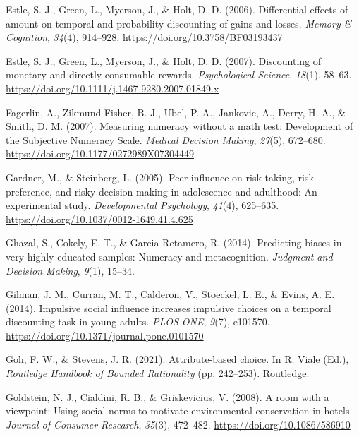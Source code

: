 \documentclass[
  pub,floatsintext]{apa6}
\newlength{\cslhangindent}
\newlength{\cslentryspacingunit} %
\newenvironment{CSLReferences}[2] %
 {%
  \setlength{\parindent}{0pt}
  \ifodd #1
  \let\oldpar\par
  \def\par{\hangindent=\cslhangindent\oldpar}
  \fi
  \setlength{\parskip}{#2\cslentryspacingunit}
 }%
 {}
\begin{document}
\begin{CSLReferences}{1}{0}
\leavevmode{}%
Estle, S. J., Green, L., Myerson, J., \& Holt, D. D. (2006). Differential effects of amount on temporal and probability discounting of gains and losses. \emph{Memory \& Cognition}, \emph{34}(4), 914--928. \url{https://doi.org/10.3758/BF03193437}

\leavevmode{}%
Estle, S. J., Green, L., Myerson, J., \& Holt, D. D. (2007). Discounting of monetary and directly consumable rewards. \emph{Psychological Science}, \emph{18}(1), 58--63. \url{https://doi.org/10.1111/j.1467-9280.2007.01849.x}

\leavevmode{}%
Fagerlin, A., Zikmund-Fisher, B. J., Ubel, P. A., Jankovic, A., Derry, H. A., \& Smith, D. M. (2007). Measuring numeracy without a math test: {Development} of the {Subjective Numeracy Scale}. \emph{Medical Decision Making}, \emph{27}(5), 672--680. \url{https://doi.org/10.1177/0272989X07304449}

\leavevmode{}%
Gardner, M., \& Steinberg, L. (2005). Peer influence on risk taking, risk preference, and risky decision making in adolescence and adulthood: {An} experimental study. \emph{Developmental Psychology}, \emph{41}(4), 625--635. \url{https://doi.org/10.1037/0012-1649.41.4.625}

\leavevmode{}%
Ghazal, S., Cokely, E. T., \& Garcia-Retamero, R. (2014). Predicting biases in very highly educated samples: {Numeracy} and metacognition. \emph{Judgment and Decision Making}, \emph{9}(1), 15--34.

\leavevmode{}%
Gilman, J. M., Curran, M. T., Calderon, V., Stoeckel, L. E., \& Evins, A. E. (2014). Impulsive social influence increases impulsive choices on a temporal discounting task in young adults. \emph{PLOS ONE}, \emph{9}(7), e101570. \url{https://doi.org/10.1371/journal.pone.0101570}

\leavevmode{}%
Goh, F. W., \& Stevens, J. R. (2021). Attribute-based choice. In R. Viale (Ed.), \emph{Routledge {Handbook} of {Bounded Rationality}} (pp. 242--253). {Routledge}.

\leavevmode{}%
Goldstein, N. J., Cialdini, R. B., \& Griskevicius, V. (2008). A room with a viewpoint: {Using} social norms to motivate environmental conservation in hotels. \emph{Journal of Consumer Research}, \emph{35}(3), 472--482. \url{https://doi.org/10.1086/586910}


\end{CSLReferences}
\end{document}
